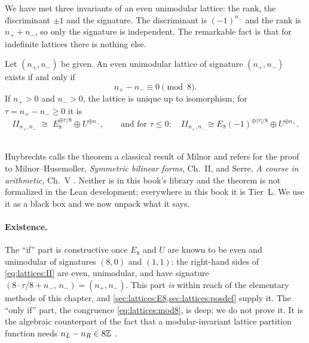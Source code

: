We have met three invariants of an even unimodular lattice: the rank, the discriminant
$\pm1$ and the signature. The discriminant is $(-1)^{n_-}$ and the rank is $n_++n_-$, so only
the signature is independent. The remarkable fact is that for indefinite lattices there is
nothing else.

\begin{theorem}\label{thm:lattices:classification}
Let $(n_+,n_-)$ be given. An even unimodular lattice of signature $(n_+,n_-)$ exists if and
only if
\begin{equation}\label{eq:lattices:mod8}
 n_+-n_-\equiv0\pmod 8 .
\end{equation}
If $n_+>0$ and $n_->0$, the lattice is unique up to isomorphism; for $\tau=n_+-n_-\ge0$ it is
\begin{equation}\label{eq:lattices:II}
 II_{n_+,n_-}\;\cong\;E_8^{\oplus\tau/8}\oplus U^{\oplus n_-},
 \qquad\text{and for }\tau\le0:\quad
 II_{n_+,n_-}\cong E_8(-1)^{\oplus|\tau|/8}\oplus U^{\oplus n_+} .
\end{equation}
\TL\ 
\end{theorem}

Huybrechts calls the theorem a classical result of Milnor and refers for the proof to Milnor--Husemoller, \emph{Symmetric bilinear forms}, Ch.~II, and
Serre, \emph{A course in arithmetic}, Ch.~V
.
Neither is in this book's library and the theorem is not formalized in the Lean development; everywhere in this
book it is Tier~L. We use it as a black box and we now unpack what it says.

\paragraph{Existence.} The ``if'' part is constructive once $E_8$ and $U$ are known to be
even and unimodular of signatures $(8,0)$ and $(1,1)$: the right-hand sides of
\eqref{eq:lattices:II} are even, unimodular, and have signature
$(8\cdot\tau/8+n_-,\,n_-)=(n_+,n_-)$. This part \emph{is} within reach of the elementary
methods of this chapter, and \cref{sec:lattices:E8,sec:lattices:posdef} supply it. The
``only if'' part, the congruence \eqref{eq:lattices:mod8}, is deep; we do not prove it. It is
the algebraic counterpart of the fact that a modular-invariant lattice partition function
needs $n_L-n_R\in8\mathbb{Z}$ .

